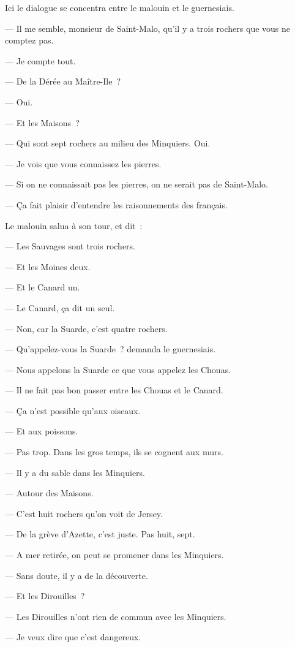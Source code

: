 \documentclass[french,twoside]{book} %
\begin{document}
 Ici le dialogue se concentra entre le malouin et le guernesiais.\par
— Il me semble, monsieur de Saint-Malo, qu’il y a trois rochers que vous ne comptez pas.\par
— Je compte tout.\par
— De la Dérée au Maître-Ile ?\par
— Oui.\par
— Et les Maisons ?\par
— Qui sont sept rochers au milieu des Minquiers. Oui.\par
— Je vois que vous connaissez les pierres.\par
— Si on ne connaissait pas les pierres, on ne serait pas de Saint-Malo.\par
— Ça fait plaisir d’entendre les raisonnements des français.\par
Le malouin salua à son tour, et dit :\par
— Les Sauvages sont trois rochers.\par
— Et les Moines deux.\par
— Et le Canard un.\par
— Le Canard, ça dit un seul.\par
— Non, car la Suarde, c’est quatre rochers.\par
— Qu’appelez-vous la Suarde ? demanda le guernesiais.\par
— Nous appelons la Suarde ce que vous appelez les Chouas.\par
— Il ne fait pas bon passer entre les Chouas et le Canard.\par
— Ça n’est possible qu’aux oiseaux.\par
— Et aux poissons.\par
— Pas trop. Dans les gros temps, ils se cognent aux murs.\par
 — Il y a du sable dans les Minquiers.\par
— Autour des Maisons.\par
— C’est huit rochers qu’on voit de Jersey.\par
— De la grève d’Azette, c’est juste. Pas huit, sept.\par
— A mer retirée, on peut se promener dans les Minquiers.\par
— Sans doute, il y a de la découverte.\par
— Et les Dirouilles ?\par
— Les Dirouilles n’ont rien de commun avec les Minquiers.\par
— Je veux dire que c’est dangereux.\par
\end{document}
